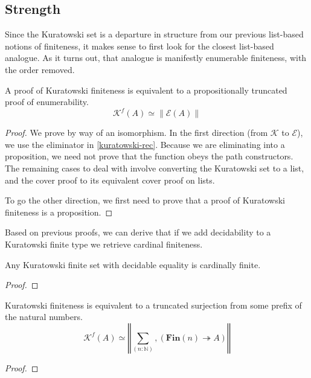 \subsection{Strength}
Since the Kuratowski set is a departure in structure from our previous
list-based notions of finiteness, it makes sense to first look for the closest
list-based analogue.
As it turns out, that analogue is manifestly enumerable finiteness, with the
order removed.
\begin{rm-theorem}
  A proof of Kuratowski finiteness is equivalent to a propositionally truncated
  proof of enumerability.
  \begin{equation}
    \mathcal{K}^f(A) \simeq \lVert \mathcal{E}(A) \rVert
  \end{equation}
\end{rm-theorem}
\begin{proof}
  We prove by way of an isomorphism.
  In the first direction (from \(\mathcal{K}\) to \(\mathcal{E}\)), we use the
  eliminator in \ref{kuratowski-rec}.
  Because we are eliminating into a proposition, we need not prove that the
  function obeys the path constructors.
  The remaining cases to deal with involve converting the Kuratowski set to a
  list, and the cover proof to its equivalent cover proof on lists.

  To go the other direction, we first need to prove that a proof of Kuratowski
  finiteness is a proposition.
\end{proof}
Based on previous proofs, we can derive that if we add decidability to a
Kuratowski finite type we retrieve cardinal finiteness.
\begin{rm-lemma}
  Any Kuratowski finite set with decidable equality is cardinally finite.
\end{rm-lemma}
\begin{proof}
\end{proof}
\begin{rm-lemma}
  Kuratowski finiteness is equivalent to a truncated surjection from some prefix
  of the natural numbers.
  \begin{equation}
    \mathcal{K}^f(A) \simeq \left\Vert \sum_{(n : \mathbb{N})} , \left(  \mathbf{Fin}(n) \twoheadrightarrow A \right) \right\Vert
  \end{equation}
\end{rm-lemma}
\begin{proof}
\end{proof}
